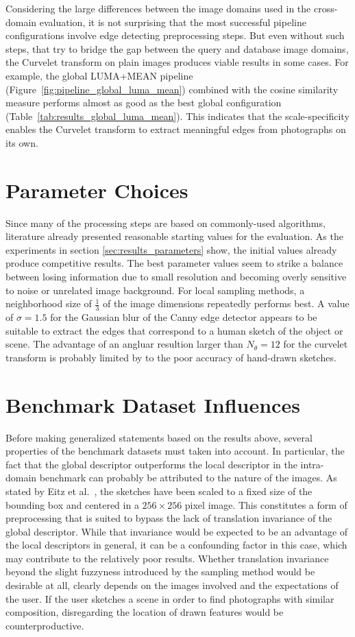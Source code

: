 Considering the large differences between the image domains used in the
cross-domain evaluation, it is not surprising that the most successful pipeline
configurations involve edge detecting preprocessing steps. But even without
such steps, that try to bridge the gap between the query and database image
domains, the Curvelet transform on plain images produces viable results in some
cases. For example, the global LUMA+MEAN pipeline
(Figure~\ref{fig:pipeline_global_luma_mean}) combined with the cosine
similarity measure performs almost as good as the best global configuration
(Table~\ref{tab:results_global_luma_mean}). This indicates that the
scale-specificity enables the Curvelet transform to extract meaningful edges
from photographs on its own.

\section{Parameter Choices}

Since many of the processing steps are based on commonly-used algorithms,
literature already presented reasonable starting values for the evaluation. As
the experiments in section \ref{sec:results_parameters} show, the initial
values already produce competitive results. The best parameter values seem to
strike a balance between losing information due to small resolution and
becoming overly sensitive to noise or unrelated image background. For local
sampling methods, a neighborhood size of $\frac{1}{3}$ of the image dimensions
repeatedly performs best. A value of $\sigma=1.5$ for the Gaussian blur of the
Canny edge detector appears to be suitable to extract the edges that correspond
to a human sketch of the object or scene. The advantage of an angluar resultion
larger than $N_{\theta}=12$ for the curvelet transform is probably limited by
to the poor accuracy of hand-drawn sketches.

\section{Benchmark Dataset Influences}

Before making generalized statements based on the results above, several
properties of the benchmark datasets must taken into account. In particular,
the fact that the global descriptor outperforms the local descriptor in the
intra-domain benchmark can probably be attributed to the nature of the images.
As stated by Eitz et al.\ \autocite{eitz_how_2012}, the sketches have been
scaled to a fixed size of the bounding box and centered in a $256 \times 256$
pixel image. This constitutes a form of preprocessing that is suited to bypass
the lack of translation invariance of the global descriptor. While that
invariance would be expected to be an advantage of the local descriptors in
general, it can be a confounding factor in this case, which may contribute to
the relatively poor results. Whether translation invariance beyond the
slight fuzzyness introduced by the sampling method would be desirable at all,
clearly depends on the images involved and the expectations of the user. If the
user sketches a scene in order to find photographs with similar composition,
disregarding the location of drawn features would be counterproductive.

